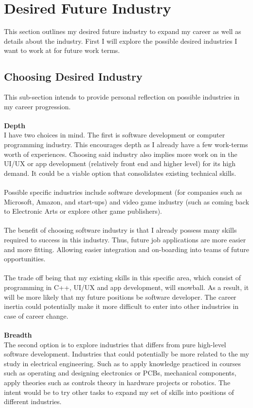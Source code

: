 \documentclass[10pt,letterpaper]{article}
\begin{document}
\clearpage
\section{Desired Future Industry}\label{desired-future-industry}

This section outlines my desired future industry to expand my career as well as details about the industry. First I will explore the possible desired industries I want to work at for future work terms.

\subsection{Choosing Desired Industry}
This sub-section intends to provide personal reflection on possible industries in my career progression.\\
\\
\textbf{Depth}\\
I have two choices in mind. The first is software development or computer programming industry. This encourages depth as I already have a few work-terms worth of experiences. Choosing said industry also implies more work on in the UI/UX or app development (relatively front end and higher level) for its high demand. It could be a viable option that consolidates existing technical skills.\cite{naics}\\
\\
Possible specific industries include software development (for companies such as Microsoft, Amazon, and start-ups) and video game industry (such as coming back to Electronic Arts or explore other game publishers).\\
\\
The benefit of choosing software industry is that I already possess many skills required to success in this industry. Thus, future job applications are more easier and more fitting. Allowing easier integration and on-boarding into teams of future opportunities.\\
\\
The trade off being that my existing skills in this specific area, which consist of programming in C++, UI/UX and app development, will snowball. As a result, it will be more likely that my future positions be software developer. The career inertia could potentially make it more difficult to enter into  other industries in case of career change.\\
\\
\textbf{Breadth}\\
The second option is to explore industries that differs from pure high-level software development. Industries that could potentially be more related to the my study in electrical engineering. Such as to apply knowledge practiced in courses such as operating and designing electronics or PCBs, mechanical components, apply theories such as controls theory in hardware projects or robotics. The intent would be to try other tasks to expand my set of skills into positions of different industries.\cite{naics}\\
\end{document}
